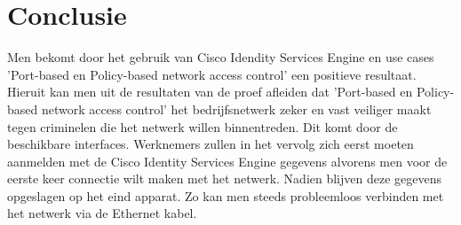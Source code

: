 
\chapter{Conclusie}
\label{ch:conclusie}


Men bekomt door het gebruik van Cisco Idendity Services Engine en use cases 'Port-based en Policy-based network access control' een positieve resultaat. Hieruit kan men uit de resultaten van de proef afleiden dat 'Port-based en Policy-based network access control' het bedrijfsnetwerk zeker en vast veiliger maakt tegen criminelen die het netwerk willen binnentreden. Dit komt door de beschikbare interfaces. Werknemers zullen in het vervolg zich eerst moeten aanmelden met de Cisco Identity Services Engine gegevens alvorens men voor de eerste keer connectie wilt maken met het netwerk. Nadien blijven deze gegevens opgeslagen op het eind apparat. Zo kan men steeds probleemloos verbinden met het netwerk via de Ethernet kabel.

